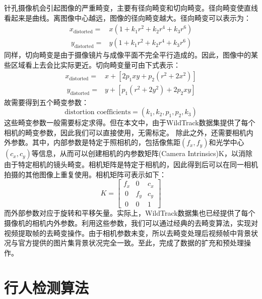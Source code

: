 针孔摄像机会引起图像的严重畸变，主要有径向畸变和切向畸变。径向畸变使直线看起来是曲线。离图像中心越远，图像的径向畸变越大。径向畸变可以表示为：
\begin{equation}
  \begin{aligned}
  x_{\text{distorted}} = & x(1+k_{1}r^{2}+k_{2}r^{4}+k_{3}r^{6}) \\\
  y_{\text{distorted}} = & y(1+k_{1}r^{2}+k_{2}r^{4}+k_{3}r^{6})
  \end{aligned}
\end{equation}
同样，切向畸变是由于摄像镜片与成像平面不完全平行造成的。因此，图像中的某些区域看上去会比实际更近。切向畸变量可由下式表示：
\begin{equation}
  \begin{aligned}
  x_{\text{distorted}} = & x+[2p_{1}xy+p_{2}(r^{2}+2x^{2})] \\\
  y_{\text{distorted}} = & y+[p_{1}(r^{2}+2y^{2})+2p_{2}xy]
  \end{aligned}
\end{equation}
故需要得到五个畸变参数：
\begin{equation}
  \text{distortion coefficients} = (k_{1}, k_{2}, p_{1}, p_{2}, k_{3})
\end{equation}
这些畸变参数一般需要标定求得。但在本文中，由于WildTrack数据集提供了每个相机的畸变参数，因此我们可以直接使用，无需标定。
除此之外，还需要相机内外参数。其中，内部参数是特定于照相机的，包括像焦距$(f_{x},f_{y})$和光学中心$(c_{x},c_{y})$等信息，从而可以创建相机的内参数矩阵(Camera Intrinsics)K，以消除由于特定相机的镜头畸变。相机矩阵是特定于相机的，因此得到后可以在同一相机拍摄的其他图像上重复使用。相机矩阵可表示如下：
\begin{equation}
K=
\left[
\begin{matrix}
f_{x} & 0 & c_{x} \\\
0 & f_{y} & c_{y} \\\
0 & 0  & 1
\end{matrix}
\right]
\end{equation}
而外部参数对应于旋转和平移矢量。实际上，WildTrack数据集也已经提供了每个摄像机的相机内外参数。利用这些参数，我们可以通过经典的去畸变算法，实现对视频提取帧的去畸变操作。由于相机参数未变，所以去畸变处理后视频帧中背景状况与官方提供的图片集背景状况完全一致。至此，完成了数据的扩充和预处理操作。

\section{行人检测算法}


